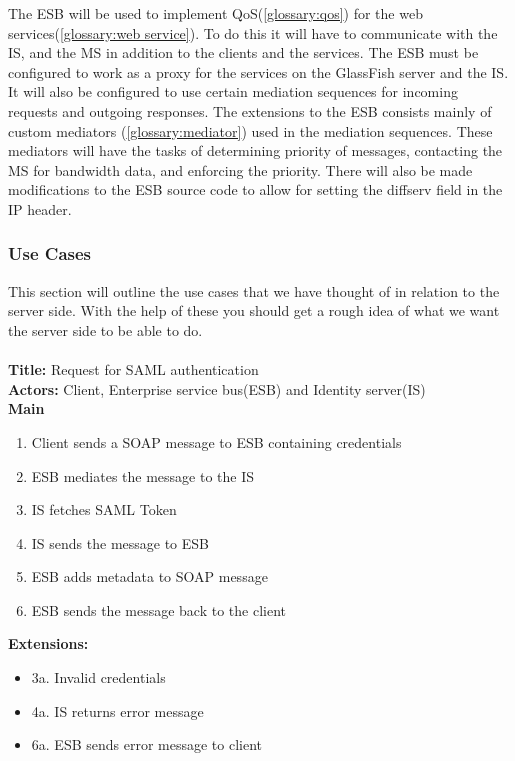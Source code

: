     The ESB will be used to implement QoS(\ref{glossary:qos}) for the web services(\ref{glossary:web service}). To do this it will have to communicate with the IS, and the MS in addition to the clients and the services. The ESB must be configured to work as a proxy for the services on the GlassFish server and the IS. It will also be configured to use certain mediation sequences for incoming requests and outgoing responses. The extensions to the ESB consists mainly of custom mediators (\ref{glossary:mediator}) used in the mediation sequences. These mediators will have the tasks of determining priority of messages, contacting the MS for bandwidth data, and enforcing the priority. There will also be made modifications to the ESB source code to allow for setting the diffserv field in the IP header.
    
    \subsubsection{Use Cases}\label{Server Use Cases}
    This section will outline the use cases that we have thought of in relation to the server side. With the help of these you should get a rough idea of what we want the server side to be able to do.\\\\
    \textbf{Title:} Request for SAML authentication \\
    \textbf{Actors:} Client, Enterprise service bus(ESB) and Identity server(IS)\\
    \textbf{Main}
    \begin{enumerate}
        \item Client sends a SOAP message to ESB containing credentials
        \item ESB mediates the message to the IS
        \item IS fetches SAML Token
        \item IS sends the message to ESB
        \item ESB adds metadata to SOAP message
        \item ESB sends the message back to the client
    \end{enumerate}
    \textbf{Extensions:}
    \begin{itemize}
        \item[] 3a. Invalid credentials 
        \item[] 4a. IS returns error message
        \item[] 6a. ESB sends error message to client
    \end{itemize}

